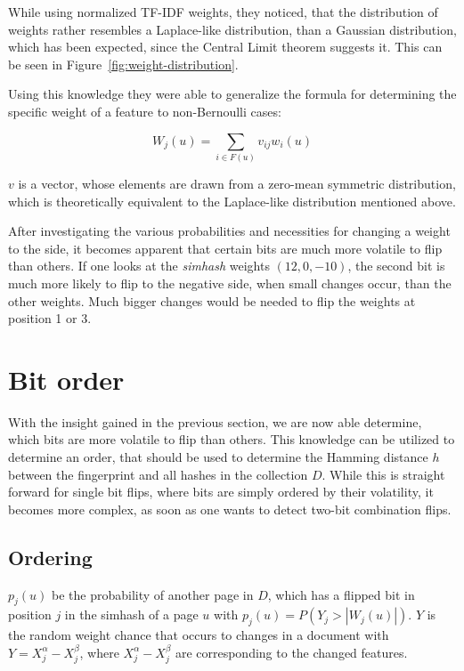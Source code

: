 \documentclass[12pt,a4paper,DIV=calc]{scrartcl}
\begin{document}
While using normalized TF-IDF weights, they noticed, that the distribution of weights rather resembles a Laplace-like distribution, than a Gaussian distribution, which has been expected, since the Central Limit theorem suggests it.
This can be seen in Figure~\ref{fig:weight-distribution}.

Using this knowledge they were able to generalize the formula for determining the specific weight of a feature to non-Bernoulli cases:

\[W_j(u) = \sum_{i \in F(u)} v_{ij}w_i(u)\]

$v$ is a vector, whose elements are drawn from a zero-mean symmetric distribution, which is theoretically equivalent to the Laplace-like distribution mentioned above.

After investigating the various probabilities and necessities for changing a weight to the side, it becomes apparent that certain bits are much more volatile to flip than others.
If one looks at the \emph{simhash} weights $(12, 0, -10)$, the second bit is much more likely to flip to the negative side, when small changes occur, than the other weights.
Much bigger changes would be needed to flip the weights at position 1 or 3.


\section{Bit order}

With the insight gained in the previous section, we are now able determine, which bits are more volatile to flip than others.
This knowledge can be utilized to determine an order, that should be used to determine the Hamming distance $h$ between the fingerprint and all hashes in the collection $D$.
While this is straight forward for single bit flips, where bits are simply ordered by their volatility, it becomes more complex, as soon as one wants to detect two-bit combination flips.

\subsection{Ordering}

$p_j(u)$ be the probability of another page in $D$, which has a flipped bit in position $j$ in the simhash of a page $u$ with $p_j(u) = P(Y_j > |W_j(u)|)$.
$Y$ is the random weight chance that occurs to changes in a document with $Y = X_j^{\alpha} - X_j^{\beta}$, where $X_j^{\alpha} - X_j^{\beta}$ are corresponding to the changed features.
\end{document}
